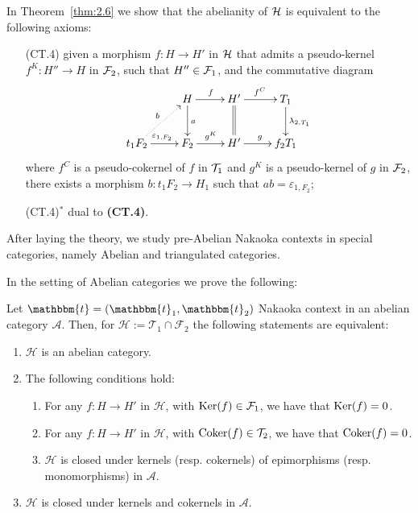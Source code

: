In Theorem~\ref{thm:2.6} we show that the abelianity of $\mathcal{H}$ is equivalent to the following axioms:
\begin{enumerate}
  \item[(CT.4)] given a morphism $f\colon H\to H'$ in $\mathcal{H}$ that admits a pseudo-kernel $f^K\colon H''\to H$ in $\mathcal{F}_2$, such that $H''\in \mathcal{F}_1$, and the commutative diagram
    \begin{equation*}
      \xymatrix{
        & H\ar[d]^{a}\ar[r]^{f} & H'\ar@{=}[d]\ar[r]^{f^C} & T_1\ar[d]^{\lambda_{2,T_1}}\\
        t_1F_2\ar@{.>}[ur]^{b}\ar[r]^{\varepsilon_{1,F_2}} & F_2\ar[r]^{g^K} & H'\ar[r]^{g} & f_2T_1
      }
    \end{equation*}
    where $f^C$  is a pseudo-cokernel of $f$ in $\mathcal{T}_1$ and $g^K$ is a pseudo-kernel of $g$ in $\mathcal{F}_2$, there exists a morphism $b\colon t_1F_2\to H_1$ such that $ab=\varepsilon_{1,F_2}$;
  \item[(CT.4)$^\ast$] dual to \textbf{(CT.4)}.
\end{enumerate}

After laying the theory, we study pre-Abelian Nakaoka contexts in special categories, namely Abelian and triangulated categories.

In the setting of Abelian categories we prove the following:

\begin{nonlisting_thm}[\ref{thm_2_4}]
  Let $\mathbbm{t}=(\mathbbm{t}_1,\mathbbm{t}_2)$ Nakaoka context in an abelian category
  $\mathscr{A}$. Then, for
  $\mathcal{H}:=\mathcal{T}_1\cap\mathcal{F}_2$ the following statements are equivalent:
  \begin{enumerate}[label=(\alph*)]
    \item $\mathcal{H}$ is an abelian category.
    \item The following conditions hold:
      \begin{enumerate}[label=(\alph{enumi}\arabic*)]
        \item For any $f:H\to H'$ in $\mathcal{H}$, with $\operatorname{Ker}(f)\in\mathcal{F}_1$,
        we have that $\operatorname{Ker}(f)=0$.
        \item For any $f:H\to H'$ in $\mathcal{H}$, with $\operatorname{Coker}(f)\in\mathcal{T}_2$,
        we have that $\operatorname{Coker}(f)=0$.
        \item $\mathcal{H}$ is closed under kernels (resp. cokernels) of epimorphisms
        (resp. monomorphisms) in $\mathscr{A}$.
      \end{enumerate}
    \item $\mathcal{H}$ is closed under kernels and cokernels in $\mathscr{A}$.
  \end{enumerate}
\end{nonlisting_thm}

